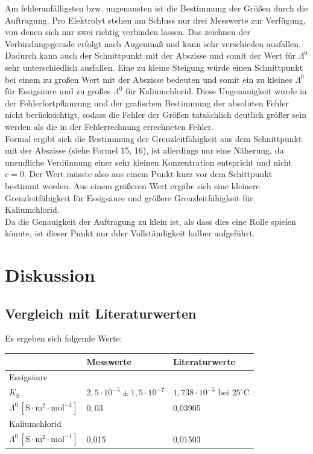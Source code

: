 \documentclass[12pt,a4paper,titlepage,headinclude,bibtotoc]{scrartcl}
\begin{document}
Am fehleranfälligsten bzw. ungenausten ist die Bestimmung der Größen durch die Auftragung. Pro Elektrolyt stehen am Schluss nur drei Messwerte zur Verfügung, von denen sich nur zwei richtig verbinden lassen. Das zeichnen der Verbindungsgerade erfolgt nach Augenmaß und kann sehr verschieden ausfallen. Dadurch kann auch der Schnittpunkt mit der Abszisse und somit der Wert für $\Lambda^0$ sehr unterschiedlich ausfallen. Eine zu kleine Steigung würde einen Schnittpunkt bei einem zu großen Wert mit der Abszisse bedeuten und somit ein zu kleines $\Lambda^0$ für Essigsäure und zu großes $\Lambda^0$ für Kaliumchlorid. Diese Ungenauigkeit wurde in der Fehlerfortpflanzung und der grafischen Bestimmung der absoluten Fehler nicht berücksichtigt, sodass die Fehler der Größen tatsächlich deutlich größer sein werden als die in der Fehlerrechnung errechneten Fehler.\\
Formal ergibt sich die Bestimmung der Grenzleitfähigkeit aus dem Schnittpunkt mit der Abszisse (siehe Formel 15, 16), ist allerdings nur eine Näherung, da unendliche Verdünnung einer sehr kleinen Konzentration entspricht und nicht $c=0$. Der Wert müsste also aus einem Punkt kurz vor dem Schittpunkt bestimmt werden. Aus einem größeren Wert ergäbe sich eine kleinere Grenzleitfähigkeit für Essigsäure und größere Grenzleitfähigkeit für Kaliumchlorid.\\
Da die Genauigkeit der Auftragung zu klein ist, als dass dies eine Rolle spielen könnte, ist dieser Punkt nur dder Vollständigkeit halber aufgeführt.\\

\section{Diskussion}
\subsection{Vergleich mit Literaturwerten}

Es ergeben sich folgende Werte:\\

\begin{table} [h]
\centering 
\begin{tabular}{p{3cm}|p{5cm}p{5cm}}
& Messwerte & Literaturwerte\\
\hline
Essigsäure & &\\
 $K_{\mathrm{S}}$ & $2,5 \cdot 10^{-5} \pm 1,5 \cdot 10^{-7}$& $1,738 \cdot 10^{-5}$ bei $25^\circ\text{C}$\protect\footnotemark\\
$\Lambda^0\, [\mathrm{S} \cdot \mathrm{m^2} \cdot \mathrm{mol^{-1}}]$ & $ 0,03\, $& 0,03905\protect\footnotemark\\
\hline
Kaliumchlorid & &\\
$\Lambda^0\, [\mathrm{S} \cdot \mathrm{m^2} \cdot \mathrm{mol^{-1}}]$ & 0,015 & 0,01503\protect\footnotemark\\
\end{tabular}
\end{table}
\end{document}
